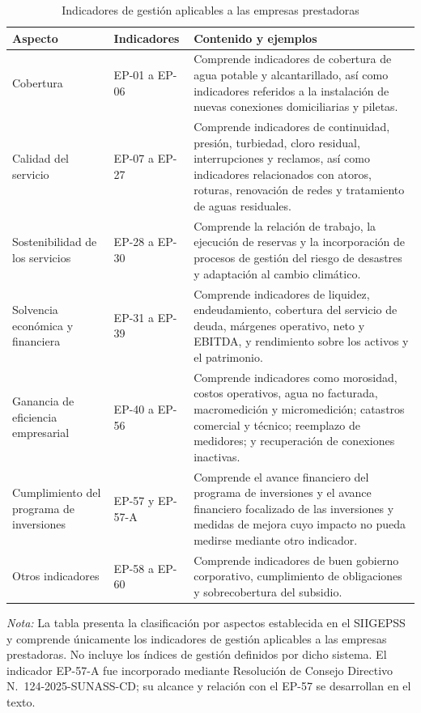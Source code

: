 \begin{table}[t]
\caption{Indicadores de gestión aplicables a las empresas prestadoras}
\label{tab:grupos_indicadores_ep}
\centering
\scriptsize
\renewcommand{\arraystretch}{1.25}
\setlength{\tabcolsep}{5pt}
\begin{tabularx}{\textwidth}{
@{}
>{\raggedright\arraybackslash}p{}
>{\centering\arraybackslash}p{}
>{\raggedright\arraybackslash}X
@{}
}
\hline
\textbf{Aspecto} & \textbf{Indicadores} & \textbf{Contenido y ejemplos} \\
\hline
Cobertura & EP-01 a EP-06 & Comprende indicadores de cobertura de agua potable y alcantarillado, así como indicadores referidos a la instalación de nuevas conexiones domiciliarias y piletas. \\
Calidad del servicio & EP-07 a EP-27 & Comprende indicadores de continuidad, presión, turbiedad, cloro residual, interrupciones y reclamos, así como indicadores relacionados con atoros, roturas, renovación de redes y tratamiento de aguas residuales. \\
Sostenibilidad de los servicios & EP-28 a EP-30 & Comprende la relación de trabajo, la ejecución de reservas y la incorporación de procesos de gestión del riesgo de desastres y adaptación al cambio climático. \\
Solvencia económica y financiera & EP-31 a EP-39 & Comprende indicadores de liquidez, endeudamiento, cobertura del servicio de deuda, márgenes operativo, neto y EBITDA, y rendimiento sobre los activos y el patrimonio. \\
Ganancia de eficiencia empresarial & EP-40 a EP-56 & Comprende indicadores como morosidad, costos operativos, agua no facturada, macromedición y micromedición; catastros comercial y técnico; reemplazo de medidores; y recuperación de conexiones inactivas. \\
Cumplimiento del programa de inversiones & EP-57 y EP-57-A & Comprende el avance financiero del programa de inversiones y el avance financiero focalizado de las inversiones y medidas de mejora cuyo impacto no pueda medirse mediante otro indicador. \\
Otros indicadores & EP-58 a EP-60 & Comprende indicadores de buen gobierno corporativo, cumplimiento de obligaciones y sobrecobertura del subsidio. \\
\hline
\end{tabularx}
\begin{minipage}{0.97\textwidth}
\footnotesize
\textit{Nota:} La tabla presenta la clasificación por aspectos establecida en el SIIGEPSS y comprende únicamente los indicadores de gestión aplicables a las empresas prestadoras. No incluye los índices de gestión definidos por dicho sistema. El indicador EP-57-A fue incorporado mediante Resolución de Consejo Directivo N.\textdegree~124-2025-SUNASS-CD; su alcance y relación con el EP-57 se desarrollan en el texto.
\end{minipage}
\end{table}

